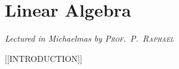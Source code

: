 \chapter[Linear Algebra \\ \textnormal{\emph{Lectured in Michaelmas \oldstylenums{2021} by \textsc{Prof.\ P.\ Raphael}}}]{Linear Algebra}
\emph{\Large Lectured in Michaelmas  by \textsc{Prof.\ P.\ Raphael}}

[[INTRODUCTION]]


